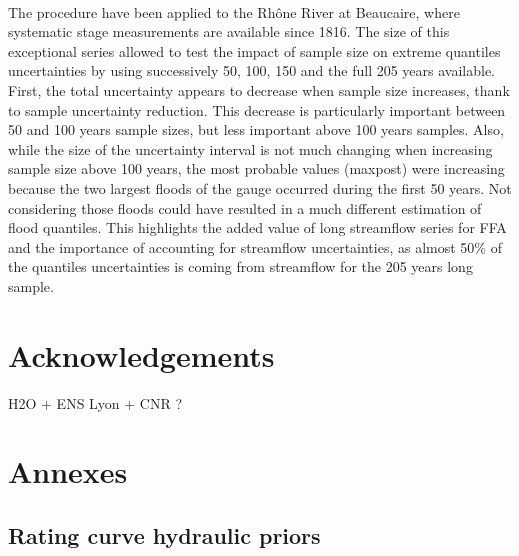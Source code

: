 \documentclass[11pt]{article}
\begin{document}
    \paragraph{}
    The procedure have been applied to the Rhône River at Beaucaire, where systematic stage measurements are available since 1816. The size of this exceptional series allowed to test the impact of sample size on extreme quantiles uncertainties by using successively 50, 100, 150 and the full 205 years available. First, the total uncertainty appears to decrease when sample size increases, thank to sample uncertainty reduction. This decrease is particularly important between 50 and 100 years sample sizes, but less important above 100 years samples. Also, while the size of the uncertainty interval is not much changing when increasing sample size above 100 years, the most probable values (maxpost) were increasing because the two largest floods of the gauge occurred during the first 50 years. Not considering those floods could have resulted in a much different estimation of flood quantiles. This highlights the added value of long streamflow series for FFA and the importance of accounting for streamflow uncertainties, as almost 50\% of the quantiles uncertainties is coming from streamflow for the 205 years long sample.

\section{Acknowledgements}

H2O + ENS Lyon + CNR ?

\newpage
\printbibliography
\newpage 

\section{Annexes}

    \subsection{Rating curve hydraulic priors}
        
\end{document}
